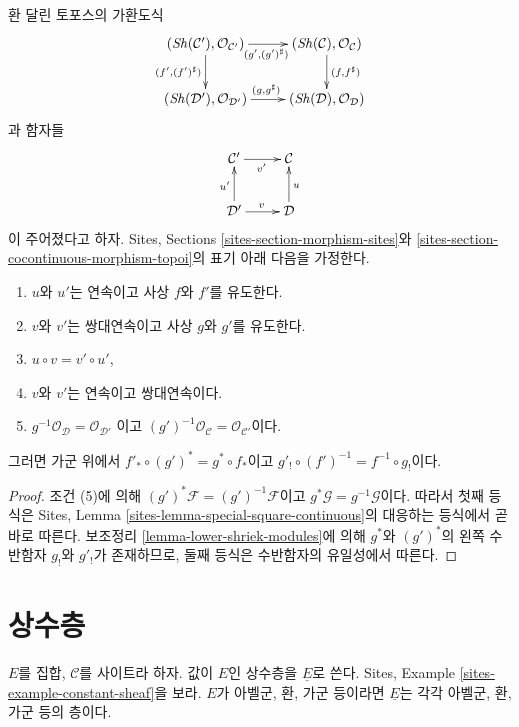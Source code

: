 \begin{lemma}
\label{lemma-special-square-continuous}
환 달린 토포스의 가환도식
$$
\xymatrix{
(\Sh(\mathcal{C}'), \mathcal{O}_{\mathcal{C}'})
\ar[r]_{(g', (g')^\sharp)} \ar[d]_{(f', (f')^\sharp)} &
(\Sh(\mathcal{C}), \mathcal{O}_\mathcal{C}) \ar[d]^{(f, f^\sharp)} \\
(\Sh(\mathcal{D}'), \mathcal{O}_{\mathcal{D}'}) \ar[r]^{(g, g^\sharp)} &
(\Sh(\mathcal{D}), \mathcal{O}_\mathcal{D})
}
$$
과 함자들
$$
\xymatrix{
\mathcal{C}' \ar[r]_{v'} &
\mathcal{C} \\
\mathcal{D}' \ar[r]^v \ar[u]^{u'} &
\mathcal{D} \ar[u]_u
}
$$
이 주어졌다고 하자. Sites, Sections \ref{sites-section-morphism-sites}와
\ref{sites-section-cocontinuous-morphism-topoi}의 표기 아래 다음을 가정한다.
\begin{enumerate}
\item $u$와 $u'$는 연속이고 사상 $f$와 $f'$를 유도한다.
\item $v$와 $v'$는 쌍대연속이고 사상 $g$와 $g'$를 유도한다.
\item $u \circ v = v' \circ u'$,
\item $v$와 $v'$는 연속이고 쌍대연속이다.
\item $g^{-1}\mathcal{O}_{\mathcal{D}} = \mathcal{O}_{\mathcal{D}'}$
이고 $(g')^{-1}\mathcal{O}_{\mathcal{C}} = \mathcal{O}_{\mathcal{C}'}$이다.
\end{enumerate}
그러면 가군 위에서 $f'_* \circ (g')^* = g^* \circ f_*$이고
$g'_! \circ (f')^{-1} = f^{-1} \circ g_!$이다.
\end{lemma}

\begin{proof}
조건 (5)에 의해 $(g')^*\mathcal{F} = (g')^{-1}\mathcal{F}$이고
$g^*\mathcal{G} = g^{-1}\mathcal{G}$이다. 따라서 첫째 등식은 Sites,
Lemma \ref{sites-lemma-special-square-continuous}의 대응하는 등식에서
곧바로 따른다. 보조정리 \ref{lemma-lower-shriek-modules}에 의해
$g^*$와 $(g')^*$의 왼쪽 수반함자 $g_!$와 $g'_!$가 존재하므로,
둘째 등식은 수반함자의 유일성에서 따른다.
\end{proof}







\section{상수층}
\label{section-constant}

\noindent
$E$를 집합, $\mathcal{C}$를 사이트라 하자. 값이 $E$인 상수층을
$\underline{E}$로 쓴다. Sites, Example \ref{sites-example-constant-sheaf}을
보라. $E$가 아벨군, 환, 가군 등이라면 $\underline{E}$는 각각
아벨군, 환, 가군 등의 층이다.

